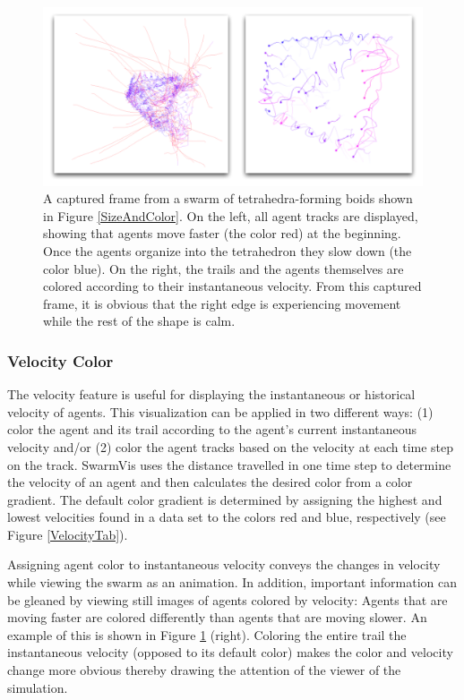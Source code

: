 \documentclass[conference]{IEEEtran}
\begin{document}
\begin{figure}
\centering
\includegraphics[scale=.33333]{images/velocity.pdf}
\caption{
A captured frame from a swarm of tetrahedra-forming boids shown in Figure \ref{SizeAndColor}.
On the left, all agent tracks are displayed, showing that agents move faster (the color red) at the beginning.
Once the agents organize into the tetrahedron they slow down (the color blue).
On the right, the trails and the agents themselves are colored according to their instantaneous velocity.
From this captured frame, it is obvious that the right edge is experiencing movement while the rest of the
shape is calm. }
\label{Velocity}
\end{figure}

\subsubsection{Velocity Color}

The velocity feature is useful for displaying the instantaneous or historical velocity of agents.
This visualization can be applied in two different ways: (1) color the agent and its trail according to the agent's current instantaneous velocity and/or (2) color the agent tracks based on the velocity at each time step on the track.
SwarmVis uses the distance travelled in one time step to determine the velocity of an agent and then calculates the 
desired color from a color gradient.
The default color gradient is determined by assigning the highest and lowest velocities found in a data set to the colors red and blue, respectively (see Figure \ref{VelocityTab}).

Assigning agent color to instantaneous velocity conveys the changes in velocity while viewing the swarm as an animation.
In addition, important information can be gleaned by viewing still images of agents colored by velocity:
Agents that are moving faster are colored differently than agents that are moving slower.
An example of this is shown in Figure \ref{Velocity} (right).
Coloring the entire trail the instantaneous velocity (opposed to its default color) makes the color and velocity change more obvious thereby drawing the attention of the viewer of the simulation.
\end{document}
